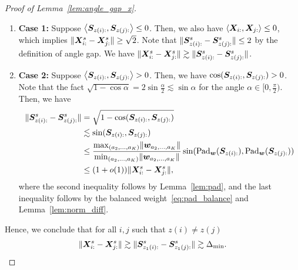 \documentclass[lettersize,onecolumn,journal]{IEEEtran}
\theoremstyle{definition}
\newtheorem{lem}{Lemma}
\theoremstyle{definition}
\newcommand{\ang}[1]{\left\langle#1\right\rangle}
\begin{document}
\begin{proof}[Proof of Lemma~\ref{lem:angle_gap_x}]
\begin{enumerate}
    \item \textbf{Case 1:} Suppose $\ang{\mS_{z(i):}, \mS_{z(j):}} \leq 0$. Then, we also have $\ang{\mX_{i:},\mX_{j:}} \leq 0$, which implies $\lVert\bm X_{i:}^s -  \bm X_{j:}^s\rVert \geq \sqrt{2}$. Note that $\lVert\bm S_{z(i):}^s - \bm S_{z(j):}^s\rVert \leq 2$ by the definition of angle gap. We have $\lVert\bm X_{i:}^s -  \bm X_{j:}^s\rVert \gtrsim \lVert\bm S_{z(i):}^s - \bm S_{z(j):}^s\rVert$.
    \item \textbf{Case 2:} Suppose $\ang{\mS_{z(i):}, \mS_{z(j):}} > 0$. Then, we have $\cos(\bm S_{z(i):}, \bm S_{z(j):}) > 0$. Note that the fact $\sqrt{1 - \cos \alpha} = 2 \sin \frac{\alpha}{2} \lesssim \sin \alpha$ for the angle $\alpha \in [0, \frac{\pi}{2})$. Then, we have 
    \begin{align}
        \lVert\bm S_{z(i):}^s - \bm S_{z(j):}^s\rVert &= \sqrt{ 1 - \cos(\bm S_{z(i):}, \bm S_{z(j):})}  \\
        & \lesssim \sin (\bm S_{z(i):}, \bm S_{z(j):})\\
        & \leq \frac{ \max_{(a_2,\ldots, a_K)} \lVert\bm{w}_{a_2,\ldots, a_K}\rVert }{  \min_{(a_2,\ldots, a_K)} \lVert\bm{w}_{a_2,\ldots, a_K}\rVert }  \sin ( \text{Pad}_{\bm{w}} (\bm S_{z(i):}), \text{Pad}_{\bm{w}}(\bm S_{z(j):})) \\
        & \leq (1 + o(1)) \lVert\bm X_{i:}^s -  \bm X_{j:}^s\rVert,
    \end{align}
    where the second inequality follows by Lemma~\ref{lem:pad}, and the last inequality follows by the balanced weight~\eqref{eq:pad_balance} and Lemma~\ref{lem:norm_diff}.
\end{enumerate}

Hence, we conclude that for all $i,j$ such that $z(i) \neq z(j)$
\begin{equation}
    \lVert\bm X_{i:}^s - \bm X_{j:}^s\rVert \gtrsim  \lVert\bm S_{z_1(i):}^s - \bm S_{z_1(j):}^s\rVert \gtrsim  \Delta_{\min}.
\end{equation}
\end{proof}

\end{document}
